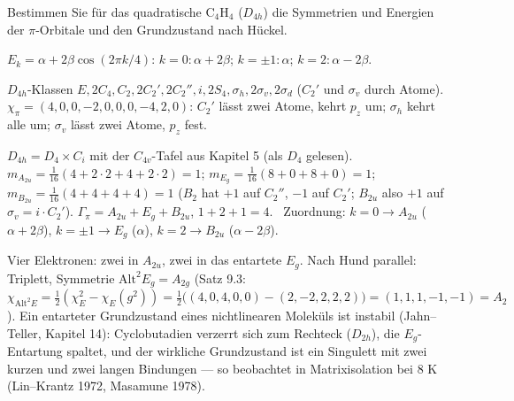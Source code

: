 \begin{aufgabe}
Bestimmen Sie für das quadratische $\mathrm{C_4H_4}$ ($D_{4h}$) die Symmetrien und Energien der $\pi$-Orbitale und den Grundzustand nach Hückel.

\loesung
{}
$E_k = \alpha + 2\beta\cos(2\pi k/4)$: $k = 0\colon\alpha + 2\beta$; $k = \pm1\colon\alpha$; $k = 2\colon\alpha - 2\beta$.

$D_{4h}$-Klassen $E, 2C_4, C_2, 2C_2', 2C_2'', i, 2S_4, \sigma_h, 2\sigma_v, 2\sigma_d$ ($C_2'$ und $\sigma_v$ durch Atome). $\chi_\pi = (4, 0, 0, -2, 0, 0, 0, -4, 2, 0)$: $C_2'$ lässt zwei Atome, kehrt $p_z$ um; $\sigma_h$ kehrt alle um; $\sigma_v$ lässt zwei Atome, $p_z$ fest.

$D_{4h} = D_4\times C_i$ mit der $C_{4v}$-Tafel aus Kapitel 5 (als $D_4$ gelesen). $m_{A_{2u}} = \frac1{16}(4 + 2\cdot2 + 4 + 2\cdot2) = 1$; $m_{E_g} = \frac1{16}(8 + 0 + 8 + 0) = 1$; $m_{B_{2u}} = \frac1{16}(4 + 4 + 4 + 4) = 1$ ($B_2$ hat $+1$ auf $C_2''$, $-1$ auf $C_2'$; $B_{2u}$ also $+1$ auf $\sigma_v = i\cdot C_2'$). $\Gamma_\pi = A_{2u} + E_g + B_{2u}$, $1 + 2 + 1 = 4$. \checkmark\ Zuordnung: $k = 0\to A_{2u}$ ($\alpha + 2\beta$), $k = \pm1\to E_g$ ($\alpha$), $k = 2\to B_{2u}$ ($\alpha - 2\beta$).

Vier Elektronen: zwei in $A_{2u}$, zwei in das entartete $E_g$. Nach Hund parallel: Triplett, Symmetrie $\mathrm{Alt}^{2}E_g = A_{2g}$ (Satz 9.3: $\chi_{\mathrm{Alt}^{2}E} = \frac12(\chi_E^{2} - \chi_E(g^{2})) = \frac12\bigl((4, 0, 4, 0, 0) - (2, -2, 2, 2, 2)\bigr) = (1, 1, 1, -1, -1) = A_2$). Ein entarteter Grundzustand eines nichtlinearen Moleküls ist instabil (Jahn--Teller, Kapitel 14): Cyclobutadien verzerrt sich zum Rechteck ($D_{2h}$), die $E_g$-Entartung spaltet, und der wirkliche Grundzustand ist ein Singulett mit zwei kurzen und zwei langen Bindungen --- so beobachtet in Matrixisolation bei $8$ K (Lin--Krantz 1972, Masamune 1978).

\begin{center}
\begin{minipage}{0.88\textwidth}
\end{minipage}
\end{center}
\end{aufgabe}

